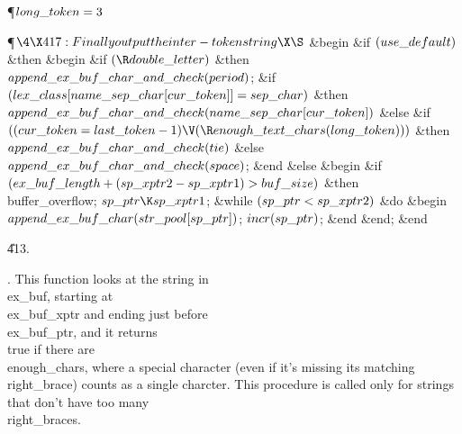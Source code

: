 \Y\P\D {}$\\{long\_token}=3$\par
\Y\P$\4\X417:Finally output the inter-token string\X\S$\6
\&{begin} \&{if} $(\\{use\_default})$ \1\&{then}\6
\&{begin} \&{if} $(\R\\{double\_letter})$ \1\&{then}\5
$\\{append\_ex\_buf\_char\_and\_check}(\\{period})$;\2\6
\&{if} $(\\{lex\_class}[\\{name\_sep\_char}[\\{cur\_token}]]=\\{sep\_char})$ \1%
\&{then}\5
$\\{append\_ex\_buf\_char\_and\_check}(\\{name\_sep\_char}[\\{cur\_token}])$\6
\4\&{else} \&{if} $((\\{cur\_token}=\\{last\_token}-1)\V(\R\\{enough\_text%
\_chars}(\\{long\_token})))$ \1\&{then}\5
$\\{append\_ex\_buf\_char\_and\_check}(\\{tie})$\6
\4\&{else} $\\{append\_ex\_buf\_char\_and\_check}(\\{space})$;\2\2\6
\&{end}\6
\4\&{else} \&{begin} \&{if} $(\\{ex\_buf\_length}+(\\{sp\_xptr2}-\\{sp%
\_xptr1})>\\{buf\_size})$ \1\&{then}\5
\\{buffer\_overflow};\2\6
$\\{sp\_ptr}\K\\{sp\_xptr1}$;\6
\&{while} $(\\{sp\_ptr}<\\{sp\_xptr2})$ \1\&{do}\6
\&{begin} $\\{append\_ex\_buf\_char}(\\{str\_pool}[\\{sp\_ptr}])$;\5
$\\{incr}(\\{sp\_ptr})$;\6
\&{end}\2\6
\&{end};\2\6
\&{end}\par
\U413.\fi

.
This function looks at the string in \\{ex\_buf}, starting at
\\{ex\_buf\_xptr} and ending just before \\{ex\_buf\_ptr}, and it returns
\\{true} if there are \\{enough\_chars}, where a special character (even if
it's missing its matching \\{right\_brace}) counts as a single charcter.
This procedure is called only for strings that don't have too many
\\{right\_brace}s.


